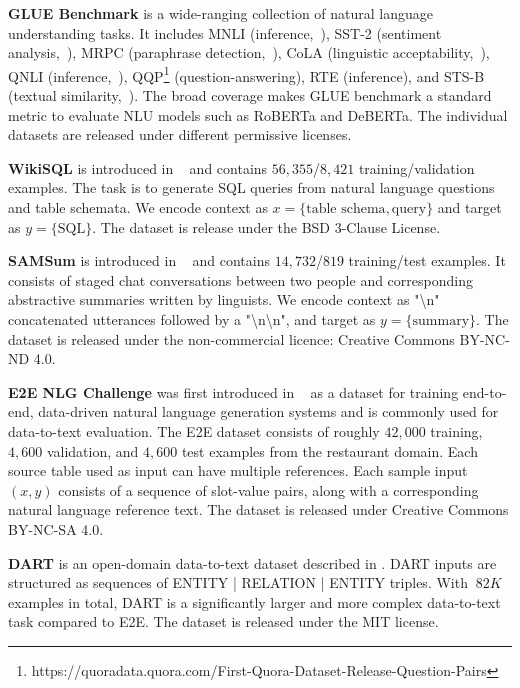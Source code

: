 \textbf{GLUE Benchmark}
is a wide-ranging collection of natural language understanding tasks.
It includes MNLI (inference,~\citet{williams-etal-2018-broad}), SST-2 (sentiment analysis,~\citet{socher-etal-2013-recursive}), MRPC (paraphrase detection,~\citet{dolan-brockett-2005-automatically}), CoLA (linguistic acceptability,~\citet{warstadt2018neural}), QNLI (inference,~\citet{DBLP:journals/corr/abs-1806-03822}), QQP\footnote{https://quoradata.quora.com/First-Quora-Dataset-Release-Question-Pairs} (question-answering), RTE (inference), and STS-B (textual similarity,~\citet{Cer_2017}).
The broad coverage makes GLUE benchmark a standard metric to evaluate NLU models such as RoBERTa and DeBERTa.
The individual datasets are released under different permissive licenses.


\textbf{WikiSQL}
is introduced in ~\cite{DBLP:journals/corr/abs-1709-00103} and contains $56,355$/$8,421$ training/validation examples.
The task is to generate SQL queries from natural language questions and table schemata.
We encode context as $x = \{ \text{table schema}, \text{query} \}$ and target as $y = \{ \text{SQL} \}$.
The dataset is release under the BSD 3-Clause License.

\textbf{SAMSum}
is introduced in ~\cite{DBLP:journals/corr/abs-1911-12237} and contains $14,732$/$819$ training/test examples.
It consists of staged chat conversations between two people and corresponding abstractive summaries written by linguists.
We encode context as "{\textbackslash}n" concatenated utterances followed by a "{\textbackslash}n{\textbackslash}n", and target as $y = \{ \text{summary} \}$. 
The dataset is released under the non-commercial licence: Creative Commons BY-NC-ND 4.0.

\textbf{E2E NLG Challenge} 
was first introduced in ~\cite{novikova2017e2e} as a dataset for training end-to-end, data-driven natural language generation systems and is commonly used for data-to-text evaluation. The E2E dataset consists of roughly $42,000$ training, $4,600$ validation, and $4,600$ test examples from the restaurant domain. Each source table used as input can have multiple references. Each sample input $(x, y)$ consists of a sequence of slot-value pairs, along with a corresponding natural language reference text.
The dataset is released under Creative Commons BY-NC-SA 4.0.

\textbf{DART} 
is an open-domain data-to-text dataset described in \cite{nan2020dart}.
DART inputs are structured as sequences of ENTITY | RELATION | ENTITY triples.
With $~82K$ examples in total, DART is a significantly larger and more complex data-to-text task compared to E2E.
The dataset is released under the MIT license.


